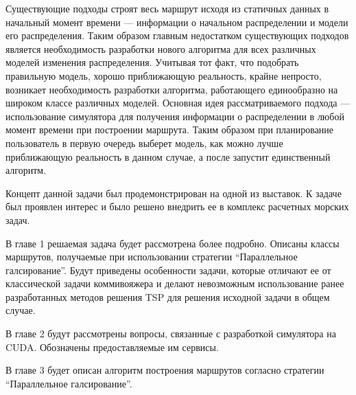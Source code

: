 \startprefacepage


 Существующие подходы строят весь маршрут исходя из статичных данных в начальный момент
времени --- информации о начальном распределении и модели его распределения.
Таким образом главным недостатком существующих подходов является необходимость
разработки нового алгоритма для всех различных моделей изменения распределения.
Учитывая тот факт, что подобрать правильную модель, хорошо приближающую реальность,
 крайне непросто, возникает необходимость разработки алгоритма,
 работающего единообразно на широком классе различных моделей.
 Основная идея рассматриваемого подхода --- использование симулятора для получения
 информации о распределении в любой момент времени при построении маршрута.
 Таким образом при планирование пользователь в первую очередь выберет модель,
 как можно лучше приближающую реальность в данном случае, а после запустит единственный алгоритм.

Концепт данной задачи был продемонстрирован на одной из выставок. К задаче был проявлен 
интерес и было решено внедрить ее в комплекс расчетных морских задач.

В главе 1 решаемая задача будет рассмотрена более подробно.
 Описаны классы маршрутов, получаемые при использовании стратегии ``Параллельное галсирование''. 
Будут приведены особенности задачи, которые отличают ее от классической задачи коммивояжера
 и делают невозможным использование ранее разработанных методов решения TSP
 для решения исходной задачи в общем случае.

В главе 2 будут рассмотрены вопросы, связанные с разработкой симулятора на CUDA.
 Обозначены предоставляемые им сервисы.

В главе 3 будет описан алгоритм построения маршрутов согласно стратегии ``Параллельное галсирование''.

\FloatBarrier
